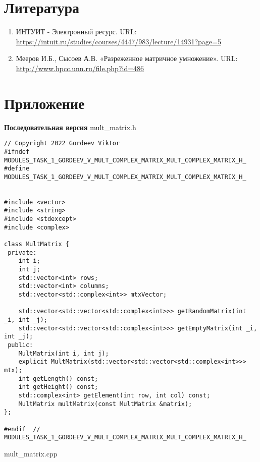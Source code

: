 \documentclass{report}
\begin{document}
\section*{Литература}
\begin{enumerate}
\item ИНТУИТ - Электронный ресурс. URL: \newline \url{https://intuit.ru/studies/courses/4447/983/lecture/14931?page=5}
\item Мееров И.Б., Сысоев А.В. «Разреженное матричное умножение». URL: \newline \url{http://www.hpcc.unn.ru/file.php?id=486}
\end{enumerate}
\newpage

\section*{Приложение}
\textbf{Последовательная версия}
\newline
\newline mult_matrix.h
\begin{lstlisting}
// Copyright 2022 Gordeev Viktor
#ifndef MODULES_TASK_1_GORDEEV_V_MULT_COMPLEX_MATRIX_MULT_COMPLEX_MATRIX_H_
#define MODULES_TASK_1_GORDEEV_V_MULT_COMPLEX_MATRIX_MULT_COMPLEX_MATRIX_H_


#include <vector>
#include <string>
#include <stdexcept>
#include <complex>

class MultMatrix {
 private:
    int i;
    int j;
    std::vector<int> rows;
    std::vector<int> columns;
    std::vector<std::complex<int>> mtxVector;

    std::vector<std::vector<std::complex<int>>> getRandomMatrix(int _i, int _j);
    std::vector<std::vector<std::complex<int>>> getEmptyMatrix(int _i, int _j);
 public:
    MultMatrix(int i, int j);
    explicit MultMatrix(std::vector<std::vector<std::complex<int>>> mtx);
    int getLength() const;
    int getHeight() const;
    std::complex<int> getElement(int row, int col) const;
    MultMatrix multMatrix(const MultMatrix &matrix);
};

#endif  // MODULES_TASK_1_GORDEEV_V_MULT_COMPLEX_MATRIX_MULT_COMPLEX_MATRIX_H_

\end{lstlisting}
mult_matrix.cpp
\end{document}
